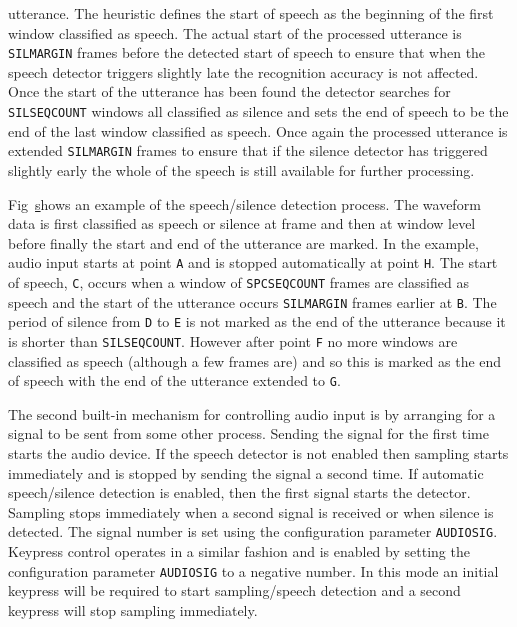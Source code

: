 utterance. The heuristic defines the start of speech as the beginning of the
first window classified as speech.  The actual start of the processed utterance
is \texttt{SILMARGIN} frames before the detected start of speech to ensure that
when the speech detector triggers slightly late the recognition accuracy is not
affected.  Once the start of the utterance has been found the detector searches
for \texttt{SILSEQCOUNT} windows all classified as silence and sets the end of
speech to be the end of the last window classified as speech.  Once again the
processed utterance is extended \texttt{SILMARGIN} frames to ensure that if the
silence detector has triggered slightly early the whole of the speech is still
available for further processing.


Fig~\href{f:endpointer} shows an example of the speech/silence detection
process. The waveform data is first classified as speech or silence at frame
and then at window level before finally the start and end of the utterance are
marked. In the example, audio input starts at point {\tt A} and is stopped
automatically at point {\tt H}. The start of speech, {\tt C}, occurs when a
window of \texttt{SPCSEQCOUNT} frames are classified as speech and the start of
the utterance occurs \texttt{SILMARGIN} frames earlier at {\tt B}. The period
of silence from {\tt D} to {\tt E} is not marked as the end of the utterance
because it is shorter than \texttt{SILSEQCOUNT}. However after point {\tt F}
no more windows are classified as speech (although a few frames are) and so
this is marked as the end of speech with the end of the utterance extended to
{\tt G}.

The second built-in mechanism for controlling audio input is by arranging for 
a signal to be sent from some other process. Sending the signal for the first
time starts the audio device. If the speech detector is not enabled then
sampling starts immediately and is stopped by sending the signal a second
time. If automatic speech/silence detection is enabled, then the first signal 
starts the detector. Sampling stops immediately when a second signal is
received or when silence is detected. The signal number is set using the 
configuration parameter \texttt{AUDIOSIG}. 
Keypress control operates in a similar fashion and is enabled by setting the 
configuration parameter \texttt{AUDIOSIG} to a negative number. In this mode
an initial keypress will be required  to start sampling/speech detection and
a second keypress will stop sampling immediately.


